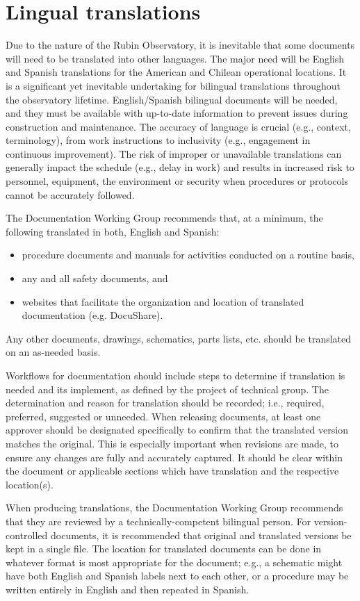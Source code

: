 \section{Lingual translations}

Due to the nature of the Rubin Observatory, it is inevitable that some documents will need to be translated into other languages.
The major need will be English and Spanish translations for the American and Chilean operational locations.
It is a significant yet inevitable undertaking for bilingual translations throughout the observatory lifetime.
English/Spanish bilingual documents will be needed, and they must be available with up-to-date information to prevent issues during construction and maintenance.
The accuracy of language is crucial (e.g., context, terminology), from work instructions to inclusivity (e.g., engagement in continuous improvement).
The risk of improper or unavailable translations can generally impact the schedule (e.g., delay in work) and results in increased risk to personnel, equipment, the environment or security when procedures or protocols cannot be accurately followed.

The Documentation Working Group recommends that, at a minimum, the following translated in both, English and Spanish:
\begin{itemize}
	\item procedure documents and manuals for activities conducted on a routine basis,
	\item any and all safety documents, and
	\item websites that facilitate the organization and location of translated documentation (e.g. DocuShare).
\end{itemize}
Any other documents, drawings, schematics, parts lists, etc. should be translated on an as-needed basis.

Workflows for documentation should include steps to determine if translation is needed and its implement, as defined by the project of technical group.
The determination and reason for translation should be recorded; i.e., required, preferred, suggested or unneeded.
When releasing documents, at least one approver should be designated specifically to confirm that the translated version matches the original.
This is especially important when revisions are made, to ensure any changes are fully and accurately captured.
It should be clear within the document or applicable sections which have translation and the respective location(s).

When producing translations, the Documentation Working Group recommends that they are reviewed by a technically-competent bilingual person.
For version-controlled documents, it is recommended that original and translated versions be kept in a single file.
The location for translated documents can be done in whatever format is most appropriate for the document; e.g., a schematic might have both English and Spanish labels next to each other, or a procedure may be written entirely in English and then repeated in Spanish.

